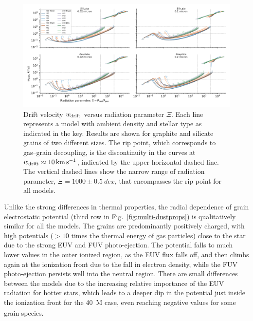  
\begin{figure}
  \includegraphics[width=\linewidth]{figs/drift-pratio-4panel}
  \caption{Drift velocity \(w_{\text{drift}}\) versus radiation parameter
    \(\Xi\). Each line represents a model with ambient density and
    stellar type as indicated in the key.  Results are shown for
    graphite and silicate grains of two different sizes.  The rip
    point, which corresponds to gas--grain decoupling, is the
    discontinuity in the curves at
    \(w_{\text{drift}} \approx \SI{10}{km.s^{-1}}\), indicated by the upper
    horizontal dashed line.  The vertical dashed lines show the narrow
    range of radiation parameter, \(\Xi = 1000 \pm \SI{0.5}{dex}\), that
    encompasses the rip point for all models. }
  \label{fig:drift-gn}
\end{figure}

Unlike the strong differences in thermal properties, the radial
dependence of grain electrostatic potential (third row in
Fig.~\ref{fig:multi-dustprops}) is qualitatively similar for all the
models.  The grains are predominantly positively charged, with high
potentials (\(> 10\) times the thermal energy of gas particles) close
to the star due to the strong EUV and FUV photo-ejection.  The
potential falls to much lower values in the outer ionized region, as
the EUV flux falls off, and then climbs again at the ionization front
due to the fall in electron density, while the FUV photo-ejection
persists well into the neutral region.  There are small differences
between the models due to the increasing relative importance of the
EUV radiation for hotter stars, which leads to a deeper dip in the
potential just inside the ionization front for the \SI{40}{M_\odot} case,
even reaching negative values for some grain species.

